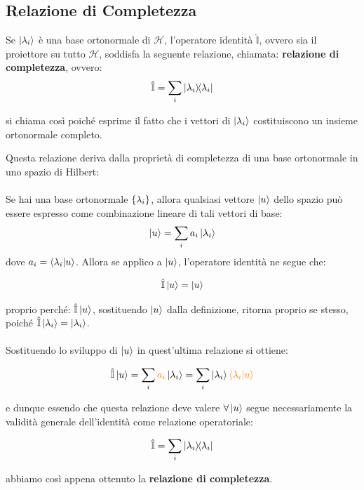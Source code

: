\subsection{Relazione di Completezza}

\begin{myth}
	Se $\ket{\lambda_i}$ è una base ortonormale di $\mathcal{H}$, l'operatore identità $\hat{\mathbb{I}}$, ovvero sia il proiettore su tutto $\mathcal{H}$, soddisfa la seguente relazione, chiamata: \textbf{relazione di completezza}, ovvero:
\begin{align*}
	\hat{\mathbb{I}} = \sum_i \ketbra{\lambda_i}
\end{align*}
\end{myth}
	
	si chiama così poiché esprime il fatto che i vettori di $\ket{\lambda_i}$ costituiscono un insieme ortonormale completo. 
	
\begin{myprf}

	Questa relazione deriva dalla proprietà di completezza di una base ortonormale in uno spazio di Hilbert:
	\\
	\\
	Se hai una base ortonormale $\qty{\lambda_i}$, allora qualsiasi vettore $\ket{u}$ dello spazio può essere espresso come combinazione lineare di tali vettori di base:
\begin{align*}
	\ket{u} = \sum_i a_i \ket{\lambda_i}
\end{align*}
	dove $a_i = \braket{\lambda_i}{u}$. Allora se applico a $\ket{u}$, l'operatore identità ne segue che:

\begin{align*}
	\hat{\mathbb{I}}\ket{u} = \ket{u}
\end{align*}
	
	proprio perché: $\hat{\mathbb{I}}\ket{u}$, sostituendo $\ket{u}$ dalla definizione, ritorna proprio se stesso, poiché $\hat{\mathbb{I}}\ket{\lambda_i} = \ket{\lambda_i}$.
	\\
	\\
	Sostituendo lo sviluppo di $\ket{u}$ in quest'ultima relazione si ottiene:
	
\begin{align*}
	\hat{\mathbb{I}} \ket{u} = \sum_i \textcolor{orange}{a_i} \ket{\lambda_i} = \sum_i \ket{\lambda_i} \textcolor{orange}{\braket{\lambda_i}{u}} 
\end{align*}
	
	e dunque essendo che questa relazione deve valere $\forall \ket{u}$ segue necessariamente la validità generale dell’identità come relazione operatoriale:

\begin{align*}
	\hat{\mathbb{I}} = \sum_i \ketbra{\lambda_i}
\end{align*}

	abbiamo così appena ottenuto la \textbf{relazione di completezza}.
\end{myprf}

